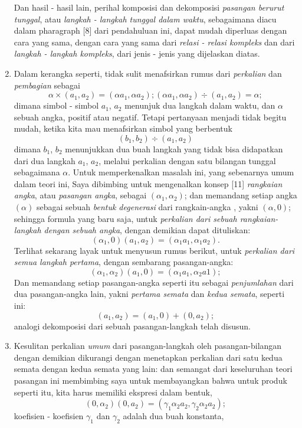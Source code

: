 \documentclass[a4paper, 12pt]{book}
\begin{document}
\begin{enumerate}
Dan hasil - hasil lain, perihal komposisi dan dekomposisi 
\textit{pasangan berurut tunggal}, atau \textit{langkah - langkah tunggal 
dalam waktu}, sebagaimana diacu dalam pharagraph [8] dari pendahuluan ini, 
dapat mudah diperluas dengan cara yang sama, dengan cara yang sama dari 
\textit{relasi - relasi kompleks} dan dari \textit{langkah - langkah kompleks}, 
dari jenis - jenis yang dijelaskan diatas.
\item Dalam kerangka seperti, tidak sulit menafsirkan rumus dari 
\textit{perkalian} dan \textit{pembagian} sebagai
\[
\alpha \times (a_1, a_2) = (\alpha a_1, \alpha a_2); (\alpha a_1, \alpha a_2) \div (a_1, a_2) = \alpha;
\]
dimana simbol - simbol $a_1$, $a_2$ menunjuk dua langkah dalam waktu, dan
$\alpha$ sebuah angka, positif atau negatif. Tetapi pertanyaan menjadi tidak
begitu mudah, ketika kita mau menafsirkan simbol yang berbentuk
\[
(b_1, b_2) \div (a_1, a_2)
\]
dimana $b_1$, $b_2$ menunjukkan dua buah langkah yang tidak bisa didapatkan
dari dua langkah $a_1$, $a_2$, melalui perkalian dengan satu bilangan tunggal
sebagaimana $\alpha$. Untuk memperkenalkan masalah ini, yang sebenarnya umum dalam
teori ini, Saya dibimbing untuk mengenalkan konsep [11] 
\textit{rangkaian angka}, atau \textit{pasangan angka}, sebagai $(\alpha_1, \alpha_2)$; 
dan memandang setiap angka $(\alpha)$ sebagai  sebuah \textit{bentuk degenerasi} 
dari rangkain-angka , yakni $(\alpha, 0)$; sehingga formula yang baru saja, untuk
\textit{perkalian dari sebuah rangkaian-langkah dengan sebuah angka}, dengan 
demikian dapat dituliskan:
\[
(\alpha_1, 0)(a_1, a_2) = (\alpha_1 a_1, \alpha_1  a_2).
\]
Terlihat sekarang layak untuk menyusun rumus berikut, untuk 
\textit{perkalian dari semua langkah pertama}, dengan sembarang pasangan-angka:
\[
(\alpha_1, \alpha_2)(a_1, 0) = (\alpha_1a_1, \alpha_2 a1);
\]
Dan memandang setiap pasangan-angka seperti itu sebagai \textit{penjumlahan} dari
dua pasangan-angka lain, yakni \textit{pertama semata} dan \textit{kedua semata},
seperti ini:
\[
(a_1, a_2) = (a_1, 0) + (0, a_2);
\]
analogi dekomposisi dari sebuah pasangan-langkah telah disusun.
\item Kesulitan perkalian \textit{umum} dari pasangan-langkah oleh 
pasangan-bilangan dengan demikian dikurangi dengan menetapkan perkalian 
dari satu kedua semata dengan kedua semata yang lain: dan semangat dari
keseluruhan teori pasangan ini membimbing saya untuk membayangkan bahwa
untuk produk seperti itu, kita harus memiliki ekspresi dalam bentuk,
\[
(0, \alpha_2) (0, a_2) = (\gamma_1\alpha_2a_2, \gamma_2\alpha_2a_2);
\]
koefisien - koefisien $\gamma_1$ dan $\gamma_2$ adalah dua buah konstanta, 

\end{enumerate}
\end{document}
